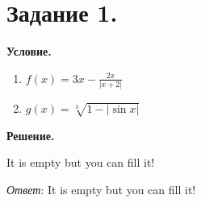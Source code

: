 \section{Задание 1.}

\textbf{Условие.}\\
\begin{enumerate}
    \item $f(x) = 3x - \frac{2x}{|x + 2|}$
    \item $g(x) = \sqrt[3]{1 - |\sin{x}|}$
\end{enumerate}

\vspace{10mm}
\textbf{Решение.}

It is empty but you can fill it!

\textit{Ответ}: It is empty but you can fill it!
\clearpage
